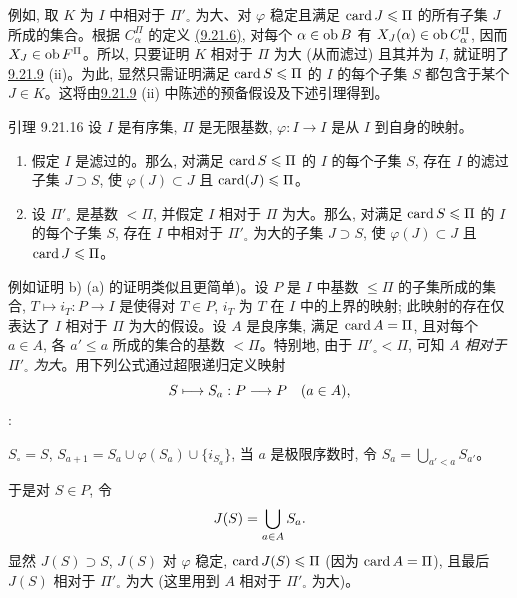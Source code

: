 例如, 取 $K$ 为 $I$ 中相对于 $\Pi'_\circ$ 为大、对 $\varphi$ 稳定且满足 $\operatorname{card} J\leqslant\Pi$ 的所有子集 $J$ 所成的集合。根据 $C^{\Pi}_\alpha$ 的定义 \hyperlink{sga4.exp.I.equation.9.21.6}{(9.21.6)}, 对每个 $\alpha\in\operatorname{ob} B$ 有 $X_J(\alpha)\in\operatorname{ob} C^{\Pi}_\alpha$, 因而 $X_J\in\operatorname{ob} F^{\Pi}$。所以, 只要证明 $K$ 相对于 $\Pi$ 为大 (从而滤过) 且其并为 $I$, 就证明了 \hyperref[I.lem9.21.9]{9.21.9} (ii)。为此, 显然只需证明满足 $\operatorname{card} S\leqslant\Pi$ 的 $I$ 的每个子集 $S$ 都包含于某个 $J\in K$。这将由\pageoriginale \hyperref[I.lem9.21.9]{9.21.9} (ii) 中陈述的预备假设及下述引理得到。


\begin{enonce*}{引理 9.21.16}
设 $I$ 是有序集, $\Pi$ 是无限基数, $\varphi:I\rightarrow I$ 是从 $I$ 到自身的映射。
\begin{enumerate}
\renewcommand{\theenumi}{\alph{enumi}}
\renewcommand{\labelenumi}{\theenumi)}
\item 假定 $I$ 是滤过的。那么, 对满足 $\operatorname{card} S\leqslant\Pi$ 的 $I$ 的每个子集 $S$, 存在 $I$ 的滤过子集 $J\supset S$, 使 $\varphi(J)\subset J$ 且 $\operatorname{card}(J)\leqslant\Pi$。

\item 设 $\Pi'_\circ$ 是基数 $<\Pi$, 并假定 $I$ 相对于 $\Pi$ 为大。那么, 对满足 $\operatorname{card} S\leqslant\Pi$ 的 $I$ 的每个子集 $S$, 存在 $I$ 中相对于 $\Pi'_\circ$ 为大的子集 $J\supset S$, 使 $\varphi(J)\subset J$ 且 $\operatorname{card} J\leqslant\Pi$。
\end{enumerate}
\end{enonce*}

例如证明 b) (a) 的证明类似且更简单)。设 $P$ 是 $I$ 中基数 $\leq\Pi$ 的子集所成的集合, $T\mapsto i_T:P\rightarrow I$ 是使得对 $T\in P$, $i_T$ 为 $T$ 在 $I$ 中的上界的映射; 此映射的存在仅表达了 $I$ 相对于 $\Pi$ 为大的假设。设 $A$ 是良序集, 满足 $\operatorname{card} A=\Pi$, 且对每个 $a\in A$, 各 $a'\leq a$ 所成的集合的基数 $<\Pi$。特别地, 由于 $\Pi'_\circ<\Pi$, 可知 $A$ \emph{相对于} $\Pi'_\circ$ \emph{为大}。用下列公式通过超限递归定义映射
$$
S\longmapsto S_a:P\longrightarrow P\quad(a\in A){},
$$
:

$S_\circ=S$, $S_{a+1}=S_a\cup\varphi(S_a)\cup\{i_{S_a}\}$,
当 $a$ 是极限序数时, 令 $S_a=\bigcup_{a'<a}S_{a'}$。

于是对 $S\in P$, 令\pageoriginale
$$
J(S)=\bigcup_{a\in A}S_a{}.
$$
显然 $J(S)\supset S$, $J(S)$ 对 $\varphi$ 稳定, $\operatorname{card} J(S)\leqslant\Pi$ (因为 $\operatorname{card} A=\Pi$), 且最后 $J(S)$ 相对于 $\Pi'_\circ$ 为大 (这里用到 $A$ 相对于 $\Pi'_\circ$ 为大)。

